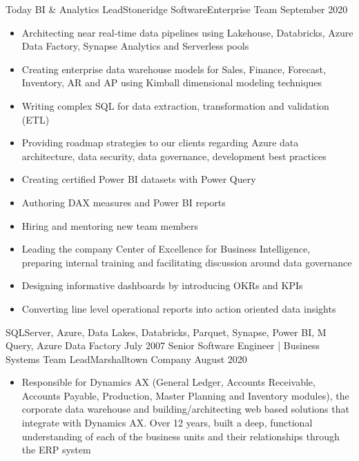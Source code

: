 %
%
%
\begin{experiences}
  \experience
    {Today}   {BI \& Analytics Lead}{Stoneridge Software}{Enterprise Team}
    {September 2020} {
                      \begin{itemize}
\item Architecting near real-time data pipelines using Lakehouse, Databricks, Azure Data Factory, Synapse Analytics and Serverless pools 
\item Creating enterprise data warehouse models for Sales, Finance, Forecast, Inventory, AR and AP using Kimball dimensional modeling techniques
\item Writing complex SQL for data extraction, transformation and validation (ETL)
\item Providing roadmap strategies to our clients regarding Azure data architecture, data security, data governance, development best practices
\item Creating certified Power BI datasets with Power Query
\item Authoring DAX measures and Power BI reports
\item Hiring and mentoring new team members
\item Leading the company Center of Excellence for Business Intelligence, preparing internal training and facilitating discussion around data governance 
\item Designing informative dashboards by introducing OKRs and KPIs 
\item Converting line level operational reports into action oriented data insights
                      \end{itemize}
                    }
                    {SQLServer, Azure, Data Lakes, Databricks, Parquet, Synapse, Power BI, M Query, Azure Data Factory}
  \emptySeparator
  \experience
    {July 2007} {Senior Software Engineer | Business Systems Team Lead}{Marshalltown Company}{}
    {August 2020}    {
                      \begin{itemize}
\item Responsible for Dynamics AX (General Ledger, Accounts Receivable, Accounts Payable, Production, Master Planning and Inventory modules), the corporate data warehouse and building/architecting web based solutions that integrate with Dynamics AX. Over 12 years, built a deep, functional understanding of each of the business units and their relationships through the ERP system

\end{itemize}}
\end{experiences}
